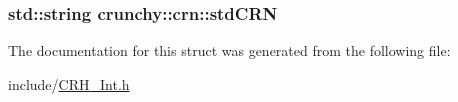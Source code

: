 \subsubsection[{std\+C\+RN}]{\setlength{\rightskip}{0pt plus 5cm}std\+::string crunchy\+::crn\+::std\+C\+RN\hspace{0.3cm}{\ttfamily [static]}}\hypertarget{structcrunchy_1_1crn_ae5f71a10acf2431498d683fee28851db}{}\label{structcrunchy_1_1crn_ae5f71a10acf2431498d683fee28851db}


The documentation for this struct was generated from the following file\+:\begin{DoxyCompactItemize}
\item 
include/\hyperlink{_c_r_h___int_8h}{C\+R\+H\+\_\+\+Int.\+h}\end{DoxyCompactItemize}
